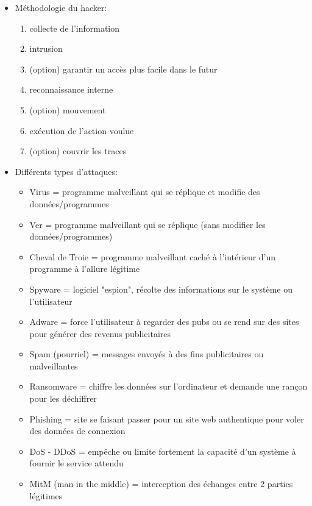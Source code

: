 \documentclass[a4paper]{article}
\begin{document}
\begin{itemize}
\item Méthodologie du hacker:
\begin{enumerate}
    \item collecte de l’information
    \item intrusion
    \item (option) garantir un accès plus facile dans le futur
    \item reconnaissance interne
    \item (option) mouvement
    \item exécution de l’action voulue
    \item (option) couvrir les traces
\end{enumerate}





\item Différents types d'attaques:
\begin{itemize}
    \item Virus = programme malveillant qui se réplique et modifie des données/programmes
    \item Ver = programme malveillant qui se réplique (sans modifier les données/programmes)
    \item Cheval de Troie = programme malveillant caché à l'intérieur d’un programme à l'allure légitime
    \item Spyware = logiciel "espion", récolte des informations sur le système ou l'utilisateur
    \item Adware = force l'utilisateur à regarder des pubs ou se rend sur des sites pour générer des revenus publicitaires
    \item Spam (pourriel) = messages envoyés à des fins publicitaires ou malveillantes
    \item Ransomware = chiffre les données sur l'ordinateur et demande une rançon pour les déchiffrer
    \item Phishing = site se faisant passer pour un site web authentique pour voler des données de connexion
    \item DoS - DDoS = empêche ou limite fortement la capacité d’un système à fournir le service attendu
    \item MitM (man in the middle) = interception des échanges entre 2 parties légitimes
\end{itemize}





\end{itemize}
\end{document}

